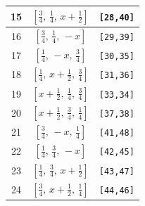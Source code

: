 \documentclass[fleqn,8pt]{jsarticle}
\begin{document}
\begin{longtable}{ccc}
15 & $\left[ \frac{3}{4},\, \frac{1}{4},\, x + \frac{1}{2} \right]$ & {\tt [28,40]} \\ \hline
16 & $\left[ \frac{3}{4},\, \frac{1}{4},\, - x \right]$ & {\tt [29,39]} \\ \hline
17 & $\left[ \frac{1}{4},\, - x,\, \frac{3}{4} \right]$ & {\tt [30,35]} \\ \hline
18 & $\left[ \frac{1}{4},\, x + \frac{1}{2},\, \frac{3}{4} \right]$ & {\tt [31,36]} \\ \hline
19 & $\left[ x + \frac{1}{2},\, \frac{1}{4},\, \frac{3}{4} \right]$ & {\tt [33,34]} \\ \hline
20 & $\left[ x + \frac{1}{2},\, \frac{3}{4},\, \frac{1}{4} \right]$ & {\tt [37,38]} \\ \hline
21 & $\left[ \frac{3}{4},\, - x,\, \frac{1}{4} \right]$ & {\tt [41,48]} \\ \hline
22 & $\left[ \frac{1}{4},\, \frac{3}{4},\, - x \right]$ & {\tt [42,45]} \\ \hline
23 & $\left[ \frac{1}{4},\, \frac{3}{4},\, x + \frac{1}{2} \right]$ & {\tt [43,47]} \\ \hline
24 & $\left[ \frac{3}{4},\, x + \frac{1}{2},\, \frac{1}{4} \right]$ & {\tt [44,46]} \\
\end{longtable}
\renewcommand{\arraystretch}{1.2}
\end{document}
